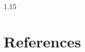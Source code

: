 \documentclass[preprint,12pt]{elsarticle1}
\numberwithin{equation}{section}
\begin{document}
\begin{spacing}{1.15}
\vspace{3mm}












\section*{References}
%


\end{spacing}
\end{document}
